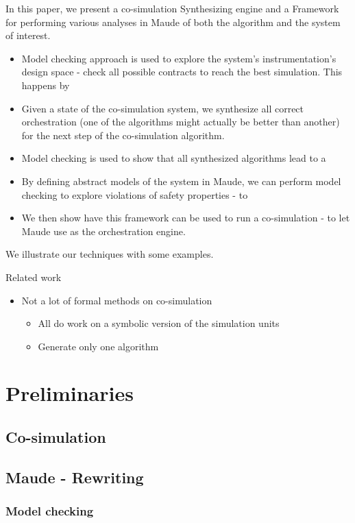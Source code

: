 \documentclass[runningheads]{llncs}
\begin{document}
In this paper, we present a co-simulation Synthesizing engine and a Framework for performing various analyses in Maude of both the algorithm and the system of interest.
\begin{itemize}
  \item Model checking approach is used to explore the system's instrumentation's design space - check all possible contracts to reach the best simulation.
  This happens by 
  \item Given a state of the co-simulation system, we synthesize all correct orchestration (one of the algorithms might actually be better than another) for the next step of the co-simulation algorithm.
  \item Model checking is used to show that all synthesized algorithms lead to a  
  \item By defining abstract models of the system in Maude, we can perform model checking to explore violations of safety properties - to 
  \item We then show have this framework can be used to run a co-simulation - to let Maude use as the orchestration engine.
\end{itemize}

We illustrate our techniques with some examples.

Related work
\begin{itemize}
  \item Not a lot of formal methods on co-simulation
  \begin{itemize}
    \item All do work on a symbolic version of the simulation units
    \item Generate only one algorithm
  \end{itemize}
\end{itemize}

\section{Preliminaries}
\subsection{Co-simulation}
\subsection{Maude - Rewriting}
\subsubsection{Model checking}
\end{document}
